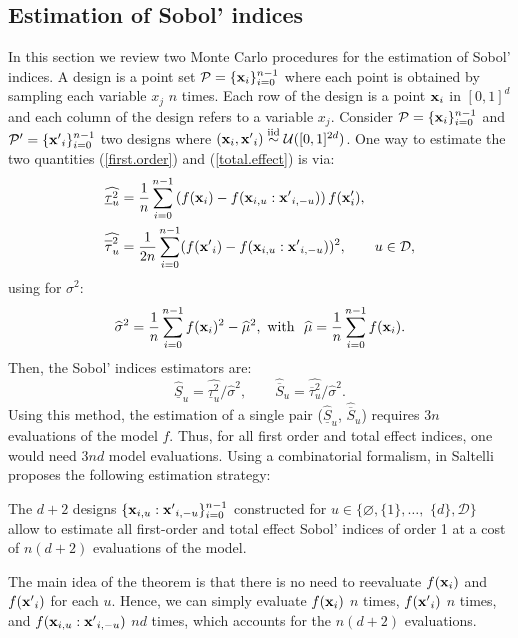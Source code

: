 \subsection{Estimation of Sobol' indices}
\label{sec:2.2}
In this section we review two Monte Carlo procedures for the estimation of Sobol' indices. A design is a point set $\mathcal{P}=\{\boldsymbol{\mathbf{x}}_i\}_{i=0}^{n-1}$ where each point is obtained by sampling each variable $x_j$ $n$ times. Each row of the design is a point $\boldsymbol{\mathbf{x}}_i$ in $[0,1]^d$ and each column of the design refers to a variable $x_j$. Consider $\mathcal{P}=\{\boldsymbol{\mathbf{x}}_i\}_{i=0}^{n-1}$ and $\mathcal{P'}=\{{\boldsymbol{\mathbf{x}}'}_i\}_{i=0}^{n-1}$ two designs where $(\boldsymbol{\mathbf{x}}_i,{\boldsymbol{\mathbf{x}}'}_i) \stackrel{{\rm iid}}{\sim} \mathcal{U}([0,1]^{2d})$. One way to estimate the two quantities (\ref{first.order}) and (\ref{total.effect}) is via:
\begin{align}
\label{first.order.est}
\widehat{\underline{\tau}_u^2} &= \frac{1}{n} \sum \limits_{i=0}^{n-1} \left(f(\vx_i)-f(\vx_{i,u}:{\vx'}_{i,-u})\right)f(\vx'_i),\\
\label{total.effect.est}
\widehat{\ov{$\tau$}_u^2} &= \frac{1}{2n} \sum \limits_{i=0}^{n-1} (f({\vx'}_i) - f(\vx_{i,u}:{\vx'}_{i,-u}))^2, \qquad u \in \mathcal{D},
\end{align}
using for $\sigma^2$:
\begin{equation}
 \widehat{\sigma}^2 = \frac{1}{n} \sum \limits_{i=0}^{n-1} f(\vx_i)^2 - \widehat{\mu}^2, \text{ with } \ \widehat{\mu} =  \frac{1}{n} \sum \limits_{i=0}^{n-1} f(\vx_i).
\label{mu.est}
\end{equation}
Then, the Sobol' indices estimators are:
\begin{equation}
\widehat{\underline{S}}_u = \widehat{\underline{\tau}_u^2} / \widehat{\sigma}^2, \qquad
\widehat{\overline{S}}_u = \widehat{\overline{\tau}_u^2} / \widehat{\sigma}^2.
\label{common.sobol.est}
\end{equation}
Using this method, the estimation of a single pair ($\widehat{\underline{S}}_u$, $\widehat{\overline{S}}_u$) requires $3n$ evaluations of the model $f$. Thus, for all first order and total effect indices, one would need $3nd$ model evaluations. Using a combinatorial formalism, in \cite{Saltelli} Saltelli proposes the following estimation strategy:
\begin{theorem}
\label{saltelli.theorem}
The $d+2$ designs $\{\boldsymbol{\mathbf{x}}_{i,u}:{\boldsymbol{\mathbf{x}}'}_{i,-u}\}_{i=0}^{n-1}$ constructed for $u \in \{\varnothing,\{1\},\dots,$ $\{d\},\mathcal{D}\}$ allow to estimate all first-order and total effect Sobol' indices of order 1 at a cost of $n(d+2)$ evaluations of the model.
\end{theorem}
The main idea of the theorem is that there is no need to reevaluate $f({\boldsymbol{\mathbf{x}}}_i)$ and $f({\boldsymbol{\mathbf{x}}'}_i)$ for each $u$. Hence, we can simply evaluate $f({\boldsymbol{\mathbf{x}}}_i)$ $n$ times, $f({\boldsymbol{\mathbf{x}}'}_i)$ $n$ times, and $f(\boldsymbol{\mathbf{x}}_{i,u}:{\boldsymbol{\mathbf{x}}'}_{i,-u})$ $nd$ times, which accounts for the $n(d+2)$ evaluations.

